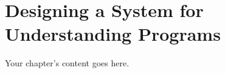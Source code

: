 
\chapter{Designing a System for\\ Understanding Programs}
\label{chapter:pegd}

Your chapter's content goes here.
